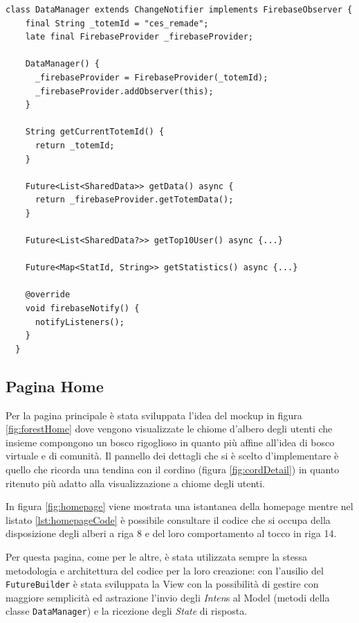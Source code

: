 \begin{lstlisting}[style=FlutterStyle, caption={Classe DataManager}, label={lst:dataManager}]
  class DataManager extends ChangeNotifier implements FirebaseObserver {
    final String _totemId = "ces_remade";
    late final FirebaseProvider _firebaseProvider;
  
    DataManager() {
      _firebaseProvider = FirebaseProvider(_totemId);
      _firebaseProvider.addObserver(this);
    }
  
    String getCurrentTotemId() {
      return _totemId;
    }
  
    Future<List<SharedData>> getData() async {
      return _firebaseProvider.getTotemData();
    }
  
    Future<List<SharedData?>> getTop10User() async {...}
  
    Future<Map<StatId, String>> getStatistics() async {...}
  
    @override
    void firebaseNotify() {
      notifyListeners(); 
    }
  }
\end{lstlisting}

\subsection{Pagina Home} 
Per la pagina principale è stata sviluppata l'idea del mockup in figura \ref{fig:forestHome} dove vengono visualizzate le chiome d'albero degli utenti che insieme compongono un bosco rigoglioso in quanto più affine all'idea di bosco virtuale e di comunità. 
Il pannello dei dettagli che si è scelto d'implementare è quello che ricorda una tendina con il cordino (figura \ref{fig:cordDetail}) in quanto ritenuto più adatto alla visualizzazione a chiome degli utenti.

In figura \ref{fig:homepage} viene mostrata una istantanea della homepage mentre nel listato \ref{lst:homepageCode} è possibile consultare il codice che si occupa della disposizione degli alberi a riga 8 e del loro comportamento al tocco in riga 14.

Per questa pagina, come per le altre, è stata utilizzata sempre la stessa metodologia e architettura del codice per la loro creazione: con l'ausilio del \texttt{FutureBuilder} è stata sviluppata la View con la possibilità di gestire con maggiore semplicità ed astrazione l'invio degli \textit{Inten}s al Model (metodi della classe \texttt{DataManager}) e la ricezione degli \textit{State} di risposta.

